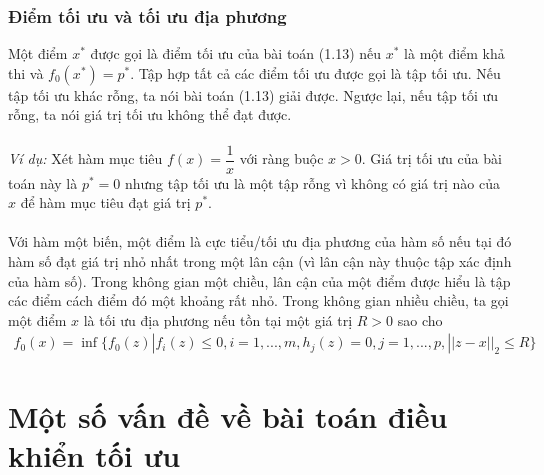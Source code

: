 \documentclass[12pt,a4paper]{report}
\begin{document}
	\subsection{Điểm tối ưu và tối ưu địa phương}
	Một điểm $x^*$ được gọi là điểm tối ưu của bài toán (1.13) nếu $x^*$ là một điểm khả thi và $f_0(x^*) = p^*$. Tập hợp tất cả các điểm tối ưu được gọi là tập tối ưu. Nếu tập tối ưu khác rỗng, ta nói bài toán (1.13) giải được. Ngược lại, nếu tập tối ưu rỗng, ta nói giá trị tối ưu không thể đạt được.\\\\ \textit{Ví dụ:} Xét hàm mục tiêu $f(x) = \dfrac{1}{x}$ với ràng buộc $x>0$. Giá trị tối ưu của bài toán này là $p^* = 0$ nhưng tập tối ưu là một tập rỗng vì không có giá trị nào của $x$ để hàm mục tiêu đạt giá trị $p^*$. \\\\ Với hàm một biến, một điểm là cực tiểu/tối ưu địa phương của hàm số nếu tại đó hàm số đạt giá trị nhỏ nhất trong một  lân cận (vì lân cận này thuộc tập xác định của hàm số). Trong không gian một chiều, lân cận của một điểm được hiểu là tập các điểm cách điểm đó một khoảng rất nhỏ. Trong không gian nhiều chiều, ta gọi một điểm $x$ là tối ưu địa phương nếu  tồn tại một giá trị $R > 0$ sao cho 
	\begin{eqnarray}
		f_0(x) = \inf\{f_0(z)|f_i(z)\leq 0, i =1,..., m, h_j(z) = 0, j=1,..., p, ||z-x||_2 \leq R\} \nonumber
	\end{eqnarray}
	
	\chapter{Một số vấn đề về bài toán điều khiển tối ưu}
\end{document}

